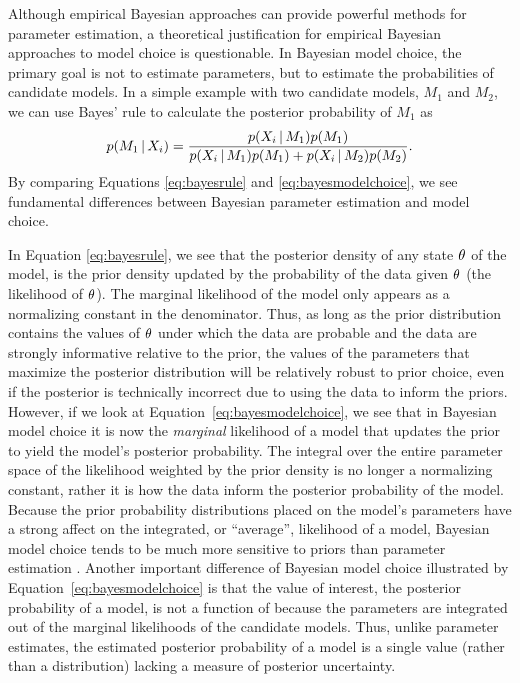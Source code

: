 \begin{linenomath}
Although empirical Bayesian approaches can provide powerful methods for
parameter estimation, a theoretical justification for empirical Bayesian
approaches to model choice is questionable.
In Bayesian model choice, the primary goal is not to estimate parameters, but
to estimate the probabilities of candidate models.
In a simple example with two candidate models, $M_1$ and $M_2$, we can use
Bayes' rule to calculate the posterior probability of $M_1$ as
\begin{equation}
    p(M_1 \given \alignment{i}{}) = \frac{p(\alignment{i}{} \given
    M_1)p(M_1)}{p(\alignment{i}{} \given M_1)p(M_1) + p(\alignment{i}{} \given
    M_2)p(M_2)}.
    \label{eq:bayesmodelchoice}
\end{equation}
By comparing Equations \ref{eq:bayesrule} and \ref{eq:bayesmodelchoice}, we
see fundamental differences between Bayesian parameter estimation and
model choice.
\end{linenomath}

In Equation \ref{eq:bayesrule}, we see that the posterior density of any state
$\theta_{}$ of the model, is the prior density updated by the probability of
the data given $\theta_{}$ (the likelihood of $\theta_{}$).
The marginal likelihood of the model only appears as a normalizing constant in
the denominator.
Thus, as long as the prior distribution contains the values of $\theta_{}$
under which the data are probable and the data are strongly informative
relative to the prior, the values of the parameters that maximize the posterior
distribution will be relatively robust to prior choice, even if the posterior
is technically incorrect due to using the data to inform the priors.
However, if we look at Equation~\ref{eq:bayesmodelchoice}, we see that in
Bayesian model choice it is now the \emph{marginal} likelihood of a model that
updates the prior to yield the model's posterior probability.
The integral over the entire parameter space of the likelihood weighted by the
prior density is no longer a normalizing constant, rather it is how the data
inform the posterior probability of the model.
Because the prior probability distributions placed on the model's parameters
have a strong affect on the integrated, or ``average'', likelihood of a model,
Bayesian model choice tends to be much more sensitive to priors than parameter
estimation \citep{Jeffreys1939,Lindley1957}.
Another important difference of Bayesian model choice illustrated by
Equation~\ref{eq:bayesmodelchoice} is that the value of interest, the posterior
probability of a model, is not a function of \myTheta{} because the parameters
are integrated out of the marginal likelihoods of the candidate models.
Thus, unlike parameter estimates, the estimated posterior probability of a
model is a single value (rather than a distribution) lacking a measure of
posterior uncertainty.

